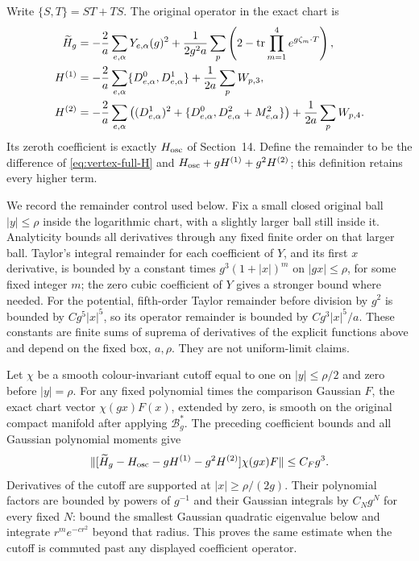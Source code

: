 Write $\{S,T\}=ST+TS$. The original operator in the exact chart is
\begin{align}
 \widetilde H_g&=-\frac2a\sum_{e,\alpha}Y_{e,\alpha}(g)^2
       +\frac1{2g^2a}\sum_p
                      \left(2-\operatorname{tr}\prod_{m=1}^4e^{g\zeta_m\cdot T}\right),
       \label{eq:vertex-full-H}\\
 H^{(1)}&=-\frac2a\sum_{e,\alpha}\{D^0_{e,\alpha},D^1_{e,\alpha}\}
                           +\frac1{2a}\sum_pW_{p,3},\nonumber\\
 H^{(2)}&=-\frac2a\sum_{e,\alpha}
       \left((D^1_{e,\alpha})^2+
             \{D^0_{e,\alpha},D^2_{e,\alpha}+M^2_{e,\alpha}\}\right)
                           +\frac1{2a}\sum_pW_{p,4}.
       \label{eq:vertex-H12}
\end{align}
Its zeroth coefficient is exactly $H_{\rm osc}$ of Section~14.
Define the remainder to be the difference of
\eqref{eq:vertex-full-H} and $H_{\rm osc}+gH^{(1)}+g^2H^{(2)}$;
this definition retains every higher term.

We record the remainder control used below. Fix a small closed original
ball $|y|\le\rho$ inside the logarithmic chart, with a slightly larger
ball still inside it. Analyticity bounds all derivatives through any
fixed finite order on that larger ball. Taylor's integral remainder
for each coefficient of $Y$, and its first $x$ derivative, is bounded
by a constant times $g^3(1+|x|)^m$ on $|gx|\le\rho$, for some
fixed integer $m$; the zero cubic coefficient of $Y$ gives a stronger
bound where needed. For the potential, fifth-order Taylor remainder
before division by $g^2$ is bounded by $C g^5|x|^5$, so its operator
remainder is bounded by $C g^3|x|^5/a$. These constants are finite
sums of suprema of derivatives of the explicit functions above and
depend on the fixed box, $a,\rho$. They are not uniform-limit claims.

Let $\chi$ be a smooth colour-invariant cutoff equal to one on
$|y|\le\rho/2$ and zero before $|y|=\rho$. For any fixed polynomial
times the comparison Gaussian $F$, the exact chart vector
$\chi(gx)F(x)$, extended by zero, is smooth on the original compact
manifold after applying $\mathcal B_g^*$. The preceding coefficient
bounds and all Gaussian polynomial moments give
\begin{equation}\label{eq:vertex-remainder-bound}
 \|[\widetilde H_g-H_{\rm osc}-gH^{(1)}-g^2H^{(2)}]
                       \chi(gx)F\|\le C_F g^3.
\end{equation}
Derivatives of the cutoff are supported at $|x|\ge\rho/(2g)$.
Their polynomial factors are bounded by powers of $g^{-1}$ and
their Gaussian integrals by $C_Ng^N$ for every fixed $N$: bound
the smallest Gaussian quadratic eigenvalue below and integrate
$r^m e^{-cr^2}$ beyond that radius. This proves the same estimate
when the cutoff is commuted past any displayed coefficient operator.

